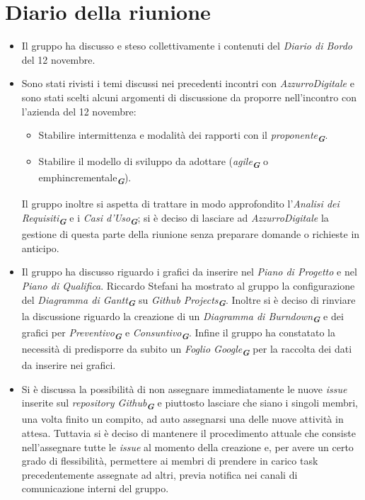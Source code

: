 

\section{Diario della riunione}

\begin{itemize}
    \item Il gruppo ha discusso e steso collettivamente i contenuti del \emph{Diario di Bordo} del 12 novembre.
    \item Sono stati rivisti i temi discussi nei precedenti incontri con \emph{AzzurroDigitale} e
    sono stati scelti alcuni argomenti di discussione da proporre nell'incontro con l'azienda del 12 novembre:
    \begin{itemize}
        \renewcommand{\labelitemii}{--}
        \item Stabilire intermittenza e modalità dei rapporti con il \emph{proponente}\textsubscript{\textit{\textbf{G}}}.
        \item Stabilire il modello di sviluppo da adottare (\emph{agile}\textsubscript{\textit{\textbf{G}}} o emph{incrementale}\textsubscript{\textit{\textbf{G}}}).
    \end{itemize}
    Il gruppo inoltre si aspetta di trattare in modo approfondito l'\emph{Analisi dei Requisiti}\textsubscript{\textit{\textbf{G}}} e i \emph{Casi d'Uso}\textsubscript{\textit{\textbf{G}}}; 
    si è deciso di lasciare ad \emph{AzzurroDigitale} la gestione di questa parte della riunione senza preparare domande o richieste in anticipo.
    \item Il gruppo ha discusso riguardo i grafici da inserire nel \emph{Piano di Progetto} e nel \emph{Piano di Qualifica}.
    Riccardo Stefani ha mostrato al gruppo la configurazione del \emph{Diagramma di Gantt}\textsubscript{\textit{\textbf{G}}} su \emph{Github Projects}\textsubscript{\textit{\textbf{G}}}.
    Inoltre si è deciso di rinviare la discussione riguardo la creazione di un \emph{Diagramma di Burndown}\textsubscript{\textit{\textbf{G}}} e dei grafici per \emph{Preventivo}\textsubscript{\textit{\textbf{G}}} e \emph{Consuntivo}\textsubscript{\textit{\textbf{G}}}.
    Infine il gruppo ha constatato la necessità di predisporre da subito un \emph{Foglio Google}\textsubscript{\textit{\textbf{G}}} per la raccolta dei dati da inserire nei grafici.
    \item Si è discussa la possibilità di non assegnare immediatamente le nuove \emph{issue} inserite sul \emph{repository Github}\textsubscript{\textit{\textbf{G}}} e piuttosto
    lasciare che siano i singoli membri, una volta finito un compito, ad auto assegnarsi una delle nuove attività in attesa.
    Tuttavia si è deciso di mantenere il procedimento attuale che consiste nell'assegnare tutte le \emph{issue} al momento della creazione e,
    per avere un certo grado di flessibilità, permettere ai membri di prendere in carico task precedentemente assegnate ad altri,
    previa notifica nei canali di comunicazione interni del gruppo.
\end{itemize}
